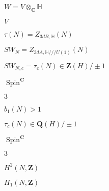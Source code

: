 \begin{preview}
\setcounter{equation}{0}%
\( W = V \otimes _{\mathbf{C}} \mathbb{H} \)
\end{preview}

\begin{preview}
\setcounter{equation}{0}%
\( V \)
\end{preview}

\begin{preview}
\setcounter{equation}{0}%
\( \tau(N) = Z_{3dB , \mathbb{H}}(N) \)
\end{preview}

\begin{preview}
\setcounter{equation}{0}%
\( SW_N = Z_{3dA, \mathbb{H} /// U(1)}(N) \)
\end{preview}

\begin{preview}
\setcounter{equation}{0}%
\( SW_{N, c} = \tau_c(N)\in \mathbf{Z}(H)/\pm 1 \)
\end{preview}

\begin{preview}
\setcounter{equation}{0}%
\( \operatorname{Spin}^{ \mathbf{C}} \)
\end{preview}

\begin{preview}
\setcounter{equation}{0}%
\( 3 \)
\end{preview}

\begin{preview}
\setcounter{equation}{0}%
\( b_1(N) > 1 \)
\end{preview}

\begin{preview}
\setcounter{equation}{0}%
\( \tau_{c}(N) \in \mathbf{Q}(H) / \pm 1 \)
\end{preview}

\begin{preview}
\setcounter{equation}{0}%
\( \operatorname{Spin}^{ \mathbf{C}} \)
\end{preview}

\begin{preview}
\setcounter{equation}{0}%
\( 3 \)
\end{preview}

\begin{preview}
\setcounter{equation}{0}%
\( H^2(N , \mathbf{Z}) \)
\end{preview}

\begin{preview}
\setcounter{equation}{0}%
\(H_1( N , \mathbf{Z})\)
\end{preview}

